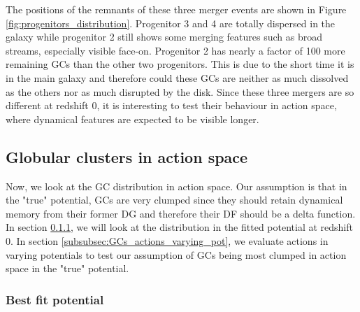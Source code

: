 The positions of the remnants of these three merger events are shown in Figure \ref{fig:progenitors_distribution}. Progenitor 3 and 4 are totally dispersed in the galaxy while progenitor 2 still shows some merging features such as broad streams, especially visible face-on. Progenitor 2 has nearly a factor of 100 more remaining \acp{GC} than the other two progenitors. This is due to the short time it is in the main galaxy and therefore could these \acp{GC} are neither as much dissolved as the others nor as much disrupted by the disk. Since these three mergers are so different at redshift 0, it is interesting to test their behaviour in action space, where dynamical features are expected to be visible longer. 

\subsection{Globular clusters in action space}\label{subsec:GCs_action_space}
Now, we look at the \ac{GC} distribution in action space. Our assumption is that in the "true" potential, \acp{GC} are very clumped since they should retain dynamical memory from their former \ac{DG} and therefore their \ac{DF} should be a delta function. In section \ref{subsubsec:GCs_actions_right_pot}, we will look at the distribution in the fitted potential at redshift 0. In section \ref{subsubsec:GCs_actions_varying_pot}, we evaluate actions in varying potentials to test our assumption of \acp{GC} being most clumped in action space in the "true" potential. 

\subsubsection{Best fit potential}\label{subsubsec:GCs_actions_right_pot}

